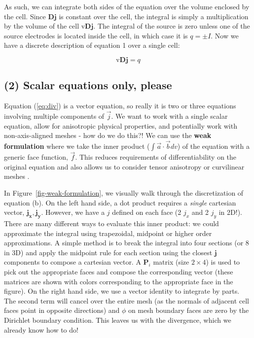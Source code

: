 \documentclass[review,authoryear,12pt]{elsarticle}
\begin{document}
As such, we can integrate both sides of the equation over the volume enclosed by the cell. Since $\mathbf{D}\mathbf{j}$ is constant over the cell, the integral is simply a multiplication by the volume of the cell $\text{v} \mathbf{D} \mathbf{j}$. The integral of the source is zero unless one of the source electrodes is located inside the cell, in which case it is $q = \pm I$. Now we have a discrete description of equation 1 over a single cell:

\begin{equation}
\label{eq:div}
\text{v} \mathbf{D}\mathbf{j} = q
\end{equation}

\subsection{(2) Scalar equations only, please}\label{(2) Scalar equations only, please}

Equation (\ref{eq:div}) is a vector equation, so really it is two or three equations involving multiple components of $\vec{j}$. We want to work with a single scalar equation, allow for anisotropic physical properties, and potentially work with non-axis-aligned meshes - how do we do this?! We can use the \textbf{weak formulation} where we take the inner product ($\int \vec{a} \cdot \vec{b} dv$) of the equation with a generic face function, $\vec{f}$. This reduces requirements of differentiability on the original equation and also allows us to consider tensor anisotropy or curvilinear meshes .

In Figure~\ref{fig-weak-formulation}, we visually walk through the discretization of equation (b). On the left hand side, a dot product requires a \textit{single} cartesian vector, $\mathbf{j_x, j_y}$. However, we have a $j$ defined on each face (2 $j_x$ and 2 $j_y$ in 2D!). There are many different ways to evaluate this inner product: we could approximate the integral using trapezoidal, midpoint or higher order approximations. A simple method is to break the integral into four sections (or 8 in 3D) and apply the midpoint rule for each section using the closest $\mathbf{j}$ components to compose a cartesian vector. A $\mathbf{P}_i$ matrix (size $2 \times 4$) is used to pick out the appropriate faces and compose the corresponding vector (these matrices are shown with colors corresponding to the appropriate face in the figure). On the right hand side, we use a vector identity to integrate by parts. The second term will cancel over the entire mesh (as the normals of adjacent cell faces point in opposite directions) and $\phi$ on mesh boundary faces are zero by the Dirichlet boundary condition. This leaves us with the divergence, which we already know how to do!
\end{document}
